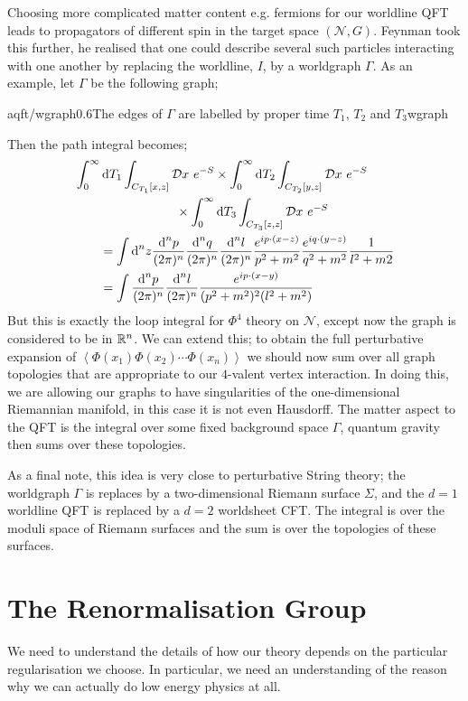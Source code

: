 Choosing more complicated matter content e.g. fermions for our worldline QFT leads to propagators of different spin in the target space $(\mathcal{N}, G)$. Feynman took this further, he realised that one could describe several such particles interacting with one another by replacing the worldline, $I$, by a worldgraph $\Gamma$. As an example, let $\Gamma$ be the following graph;
\begin{mygraphic}{aqft/wgraph}{0.6}{The edges of $\Gamma$ are labelled by proper time $T_1$, $T_2$ and $T_3$}{wgraph}\end{mygraphic}
Then the path integral becomes;
\begin{align*}
&\int_0^{\infty}{\text{d} T_1}\int_{C_{T_1}[x,z]}{\mathcal{D} x \,\,e^{-S}}\times \int_0^{\infty}{\text{d} T_2}\int_{C_{T_2}[y,z]}{\mathcal{D} x\,\, e^{-S}} \\ 
&\qquad \qquad\qquad\qquad\times\int_{0}^{\infty}{\text{d} T_3}\int_{C_{T_3}[z,z]}{\mathcal{D} x \,\, e^{-S}} \\
&\qquad = \int{\text{d}^n z\frac{\text{d}^n p}{(2\pi)^{n}}\frac{\text{d}^n q}{(2\pi)^{n}}\frac{\text{d}^n l}{(2\pi)^{n}}\frac{e^{ip\cdot(x - z)}}{p^2 + m^2}\frac{e^{iq\cdot(y - z)}}{q^2 + m^2}\frac{1}{l^2 + m2}} \\
&\qquad = \int{\frac{\text{d}^n p}{(2\pi)^n}\frac{\text{d}^n l}{(2\pi)^n}\frac{e^{ip\cdot(x - y)}}{(p^2 + m^2)^2 (l^2 + m^2)}}
\end{align*}
But this is exactly the loop integral for $\Phi^4$ theory on $\mathcal{N}$, except now the graph is considered to be in $\mathbb{R}^n$. We can extend this; to obtain the full perturbative expansion of $\left< \Phi(x_1) \Phi(x_2)\cdots\Phi(x_n) \right>$ we should now sum over all graph topologies that are appropriate to our $4$-valent vertex interaction. In doing this, we are allowing our graphs to have singularities of the one-dimensional Riemannian manifold, in this case it is not even Hausdorff. The matter aspect to the QFT is the integral over some fixed background space $\Gamma$, quantum gravity then sums over these topologies. 

\paraskip
As a final note, this idea is very close to perturbative String theory; the worldgraph $\Gamma$ is replaces by a two-dimensional Riemann surface $\Sigma$, and the $d = 1$ worldline QFT is replaced by a $d = 2$ worldsheet CFT. The integral is over the moduli space of Riemann surfaces and the sum is over the topologies of these surfaces.
\newpage
\section{The Renormalisation Group}
We need to understand the details of how our theory depends on the particular regularisation we choose. In particular, we need an understanding of the reason why we can actually do low energy physics at all.

